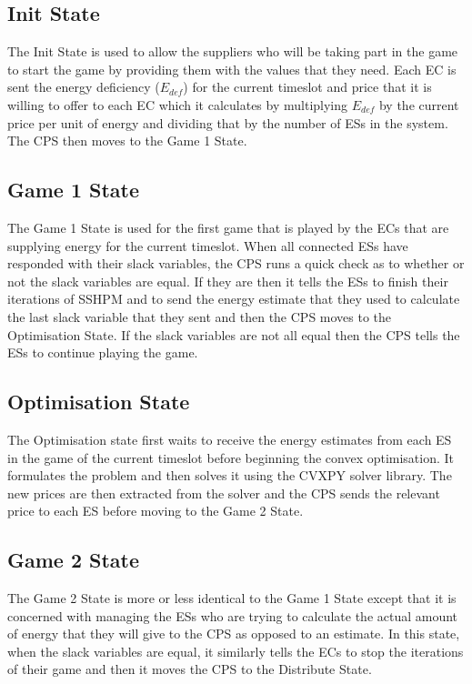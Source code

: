 \documentclass[a4paper, notitlepage]{report}
\begin{document}
\subsection{Init State}
\label{sec:orgeffdff6}
The Init State is used to allow the suppliers who will be taking part in the
game to start the game by providing them with the values that they need. Each EC
is sent the energy deficiency (\(E_{def}\)) for the current timeslot and price that
it is willing to offer to each EC which it calculates by multiplying \(E_{def}\) by
the current price per unit of energy and dividing that by the number of ESs in
the system. The CPS then moves to the Game 1 State.
\subsection{Game 1 State}
\label{sec:orga37f87e}
The Game 1 State is used for the first game that is played by the ECs that are
supplying energy for the current timeslot. When all connected ESs have responded
with their slack variables, the CPS runs a quick check as to whether or not the
slack variables are equal. If they are then it tells the ESs to finish their
iterations of SSHPM and to send the energy estimate that they used to calculate
the last slack variable that they sent and then the CPS moves to the
Optimisation State. If the slack variables are not all equal then the CPS tells
the ESs to continue playing the game.
\subsection{Optimisation State}
\label{sec:org2db7e6f}
The Optimisation state first waits to receive the energy estimates from each ES
in the game of the current timeslot before beginning the convex optimisation. It
formulates the problem and then solves it using the CVXPY \cite{diamond2016cvxpy}
solver library. The new prices are then extracted from the solver and the CPS
sends the relevant price to each ES before moving to the Game 2 State.
\subsection{Game 2 State}
\label{sec:org6d0507d}
The Game 2 State is more or less identical to the Game 1 State except that it is
concerned with managing the ESs who are trying to calculate the actual amount of
energy that they will give to the CPS as opposed to an estimate. In this state,
when the slack variables are equal, it similarly tells the ECs to stop the
iterations of their game and then it moves the CPS to the Distribute State.
\end{document}
